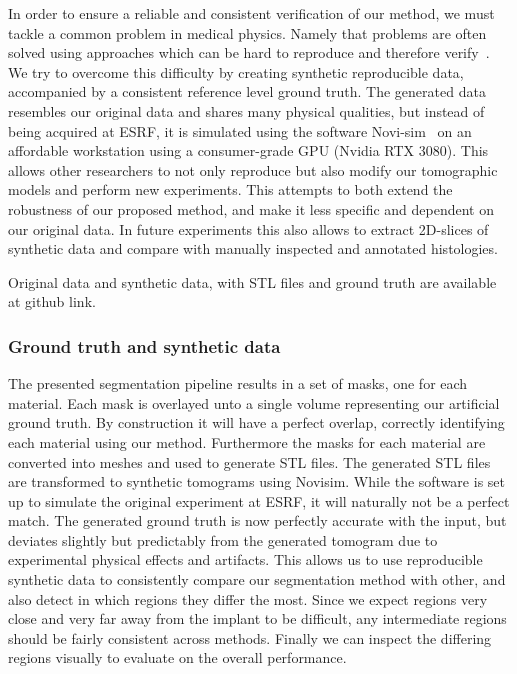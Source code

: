 In order to ensure a reliable and consistent verification of our method, we
must tackle a common problem in medical physics. Namely that problems are often
solved using approaches which can be hard to reproduce and therefore
verify~\cite{replication-crisis}. We try to overcome this difficulty by
creating synthetic reproducible data, accompanied by a consistent reference
level ground truth. The generated data resembles our original data and shares
many physical qualities, but instead of being acquired at ESRF, it is simulated
using the software Novi-sim~\cite{novisim} on an affordable workstation using a
consumer-grade GPU (Nvidia RTX 3080). This allows other researchers to not only
reproduce but also modify our tomographic models and perform new experiments.
This attempts to both extend the robustness of our proposed method, and make it
less specific and dependent on our original data. In future experiments this
also allows to extract 2D-slices of synthetic data and compare with manually
inspected and annotated histologies.

Original data and synthetic data, with STL files and ground truth are available
at github link.

\subsubsection{Ground truth and synthetic data}

The presented segmentation pipeline results in a set of masks, one for each
material.  Each mask is overlayed unto a single volume representing our
artificial ground truth. By construction it will have a perfect overlap,
correctly identifying each material using our method.  Furthermore the masks
for each material are converted into meshes and used to generate STL files.
The generated STL files are transformed to synthetic tomograms using Novisim.
While the software is set up to simulate the original experiment at ESRF, it
will naturally not be a perfect match. The generated ground truth is now
perfectly accurate with the input, but deviates slightly but predictably from
the generated tomogram due to experimental physical effects and artifacts. This
allows us to use reproducible synthetic data to consistently compare our
segmentation method with other, and also detect in which regions they differ
the most. Since we expect regions very close and very far away from the implant
to be difficult, any intermediate regions should be fairly consistent across
methods. Finally we can inspect the differing regions visually to evaluate on
the overall performance.

